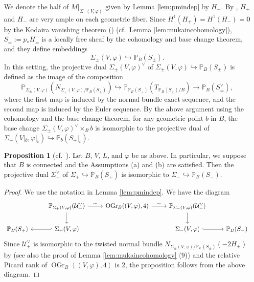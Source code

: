 \documentclass[autodetect-engine, a4paper]{amsart}
\theoremstyle{definition}
\newtheorem{prop}[thm]{Proposition}
\def\P{{\mathbb P}}
\DeclareMathOperator\OGr{\mathrm{OGr}}
\newcommand{\cred}{\color{black}}
\begin{document}
We denote the half of $M|_{\Sigma_{-}(V,\varphi)}$ given by Lemma \ref{lem:pmindep} by $H_{-}$.
{\cred By \cite[Section 1]{Mukaicurve}, $H_{+}$ and $H_{-}$ are very ample on each geometric fiber.
Since $H^1 (H_{+}) = H^1 (H_{-})=0$ by the Kodaira vanishing theorem (\cite[Proposition 2 and Theorem 2]{Mehta-Ramanathan}) 
(cf.\ Lemma \ref{lem:mukaincohomology}),
$S_{\pm} := p_{\ast} H_{\pm}$ is a locally free sheaf by the cohomology and base change theorem, and
they define embeddings
\[
\Sigma_{\pm} (V, \varphi) \hookrightarrow \P_{B} ( S_{\pm} ).
\]
}
{\cred In this setting, the projective dual $\Sigma_{\pm} (V, \varphi)^{\vee}$ of $\Sigma_{\pm} (V, \varphi) \hookrightarrow \P_{B} ( S_{\pm} )$ is defined as the image of the composition 
\[
\P_{\Sigma_{\pm} (V, \varphi)} (N_{\Sigma_{\pm} (V, \varphi)/\P_{B}(S_{\pm})}) \hookrightarrow
\P_{\P_{B}(S_{\pm})} (T_{\P_{B}(S_{\pm})/B}) \rightarrow \P_{B} (S_{\pm}^{\vee}),
\]
where the first map is induced by the normal bundle exact sequence, and the second map is induced by the Euler sequence.
By the above argument using the cohomology and the base change theorem, for any geometric point $b$ in $B$, the base change $\Sigma_{\pm} (V, \varphi)^{\vee} \times_{B} b$ is isomorphic to the projective dual of 
$\Sigma_{\pm} (V|_{b}, \varphi|_{b}) \hookrightarrow \P_{b} ( S_{\pm} |_{b})$.
}



\begin{prop}[cf.\ {\cite[Proposition 2.7]{Mukaicurve}}]
\label{prop:spinorduality}
Let $B$, $V$, $L$, and $\varphi$ be as above. In particular, we suppose that $B$ is connected and the Assumptions (a) and (b) are satisfied. 
Then the projective dual $\Sigma_{+}^{\vee}$ of $\Sigma_{+} \hookrightarrow \P_{B} (S_{+})$ is isomorphic to 
$\Sigma_{-} \hookrightarrow \P_{B} (S_{-})$.
\end{prop}

\begin{proof}
We use the notation in Lemma \ref{lem:pmindep}.
We have the diagram
\[
\begin{tikzcd}
&   \P_{\Sigma_{+}(V, \varphi)}(\mathcal{U}_{+}^{\vee}) \ar[d] \ar[r, "\sim"] & \OGr_{B} ((V,\varphi),4) \ar[r, "\sim"] & \P_{\Sigma_{-}(V, \varphi)}(\mathcal{U}_{-}^{\vee}) \ar[d] & \\
\P_{B} (S_{+}) & \Sigma_{+} (V, \varphi)\ar[l,hook'] && \Sigma_{-} (V,\varphi) \ar[r,hook] & \P_{B}(S_{-}) 
\end{tikzcd}
\]
Since $\mathcal{U}_{\pm}^{\vee}$ is isomorphic to 
the twisted normal bundle $N_{\Sigma_{\pm}(V,\varphi)/\P_{B}(S_{\pm})} (-2H_{\pm})$ by \cite[Corollary 2.4]{Mukaicurve} (see also the proof of Lemma \ref{lem:mukaincohomology} (9)) and the relative Picard rank of $\OGr_{B}((V,\varphi),4)$ is $2$, the proposition follows from the above diagram.
\end{proof}
\end{document}
